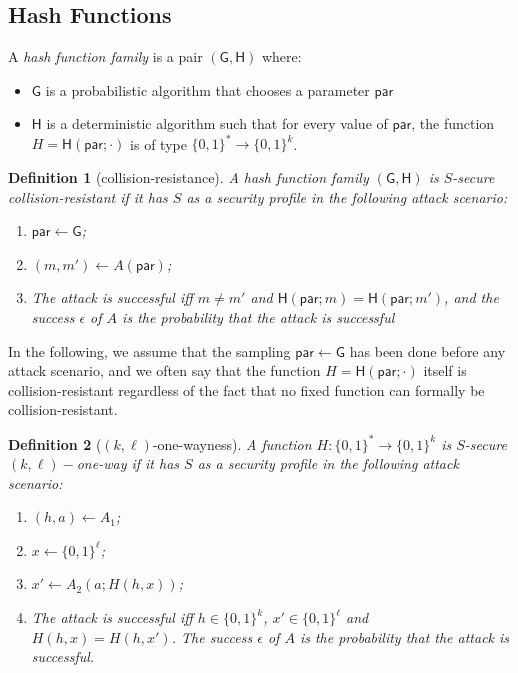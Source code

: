 \documentclass{article}
\newtheorem{definition}{Definition}[section]
\newcommand{\bits}[1]{\{0,1\}^{#1}}
\newcommand{\hfgen}[0]{\mathsf{G}} %
\newcommand{\hfunc}[0]{\mathsf{H}} %
\newcommand{\param}[0]{\mathsf{par}}
\begin{document}
\subsection{Hash Functions}

\noindent A \emph{hash function family} is a pair $(\hfgen,\hfunc)$ where:
\begin{itemize}
\item $\hfgen$ is a probabilistic algorithm that chooses a parameter $\param$
\item $\hfunc$ is a deterministic algorithm such that for every value of $\param$, the function $H=\hfunc(\param; \cdot)$ is of type $\bits{\ast} \to \bits{k}$.
\end{itemize}

\begin{definition}[collision-resistance]
A hash function family $(\hfgen,\hfunc)$ is $S$-secure collision-resistant if it has $S$ as a security profile in the following attack scenario:
\begin{enumerate}
\item $\param \gets \hfgen$;
\item $(m,m')\gets A(\param)$;
\item The attack is successful iff $m\neq m'$ and $\hfunc(\param;m)=\hfunc(\param;m')$,
and the success $\epsilon$ of $A$ is the probability that the attack is successful
\end{enumerate}
\end{definition}

\noindent In the following, we assume that the sampling $\param \gets \hfgen$ has been done before any attack scenario, and we often say that the function $H=\hfunc(\param; \cdot)$ itself is collision-resistant regardless of the fact that no fixed function can formally be collision-resistant.

\begin{definition}[$(k,\ell)$-one-wayness]
A function $H\colon \{0,1\}^\ast\rightarrow\{0,1\}^k$
is $S$-secure $(k,\ell)-$\emph{one-way} if it has $S$ as a security profile in the following attack scenario:
\begin{enumerate}
\item $(h,a)\gets A_1$;
\item $x \gets \{0,1\}^\ell$;
\item $x'\gets A_2(a;H(h,x))$;
\item The attack is successful iff $h\in\{0,1\}^k$, $x'\in\{0,1\}^\ell$ and $H(h,x)=H(h,x')$.
The success $\epsilon$ of $A$ is the probability that the attack is successful.
\end{enumerate}
\end{definition}
\end{document}
